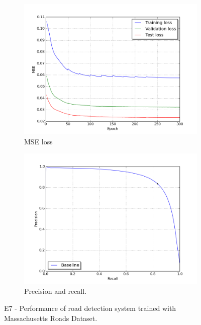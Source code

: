 \begin{figure}
\begin{subfigure}{0.5\textwidth}
\includegraphics[width=\linewidth]{figs/E6/E6_lc_loss.png}
\caption{MSE loss} \label{fig:E7_performance_mass_lc}
\end{subfigure}
\hspace*{\fill} %
\begin{subfigure}{0.5\textwidth}
\includegraphics[width=\linewidth]{figs/E6/E6_pr.png}
\caption{Precision and recall.} \label{fig:E7_performance_mass_pr}
\end{subfigure}
\hspace*{\fill} %
\caption[E7 - Performance of road detection system trained with Massachusetts Roads Dataset]{E7 - Performance of road detection system trained with Massachusetts Roads Dataset.} \label{fig:E7_performance_mass}
\end{figure}

